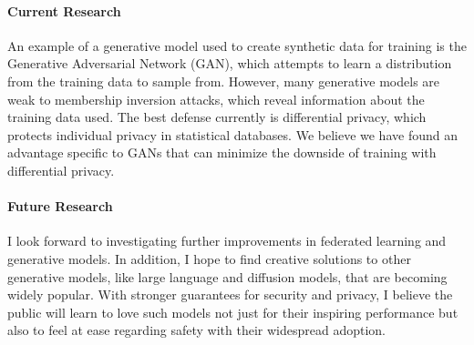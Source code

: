 \documentclass[10pt]{article}
\begin{document}
    \paragraph{Current Research}
    An example of a generative model used to create synthetic data for training is the Generative Adversarial Network (GAN), which attempts to learn a distribution from the training data to sample from.
    However, many generative models are weak to membership inversion attacks, which reveal information about the training data used.
    The best defense currently is differential privacy, which protects individual privacy in statistical databases. 
    We believe we have found an advantage specific to GANs that can minimize the downside of training with differential privacy.

    \paragraph{Future Research}
    I look forward to investigating further improvements in federated learning and generative models. 
    In addition, I hope to find creative solutions to other generative models, like large language and diffusion models, that are becoming widely popular.
    With stronger guarantees for security and privacy, I believe the public will learn to love such models not just for their inspiring performance but also to feel at ease regarding safety with their widespread adoption. 
\end{document}
